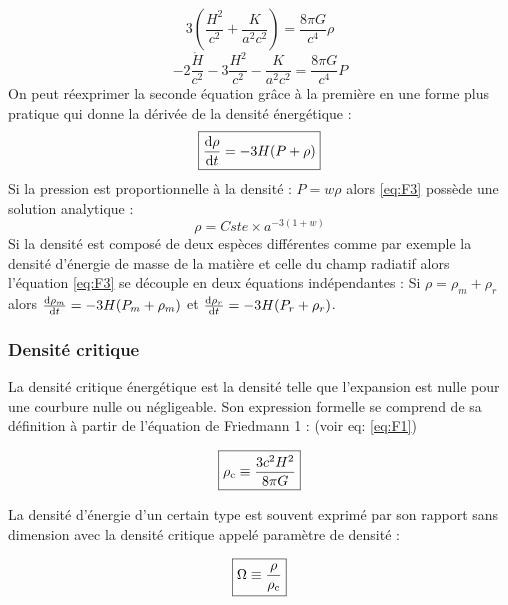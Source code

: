 \documentclass[10pt, a4paper]{report}
\numberwithin{equation}{subsection}
\begin{document}
\begin{equation} \label{eq:F1}
\boxed{3 \left(\frac{H^2}{c^2} + \frac{K}{a^2 c^2} \right) = \frac{8 \pi G}{c^4} \rho}
\end{equation}
\begin{equation} \label{eq:F2}
\boxed{- 2 \frac{\dot H}{c^2} - 3 \frac{H^2}{c^2} - \frac{K}{a^2 c^2} =  \frac{8 \pi G}{c^4} P }
\end{equation}
On peut réexprimer la seconde équation grâce à la première en une forme plus pratique qui donne la dérivée de la densité énergétique :
\begin{equation} \label{eq:F3}
\boxed{\frac{{\rm d}\rho}{{\rm d}t} = - 3 H (P + \rho) }
\end{equation}
Si la pression est proportionnelle à la densité : $P= w \rho$ alors \ref{eq:F3} possède une solution analytique :
\begin{equation} \label{eq:F3S}
\boxed{\rho = Cste \times a^{-3(1+w)}}
\end{equation}
Si la densité est composé de deux espèces différentes comme par exemple la densité d'énergie de masse de la matière et celle du champ radiatif alors l'équation \ref{eq:F3} se découple en deux équations indépendantes : Si $\rho = \rho_m + \rho_r$ alors $\frac{{\rm d}\rho_m}{{\rm d}t} = - 3 H (P_m + \rho_m) $ et $\frac{{\rm d}\rho_r}{{\rm d}t} = - 3 H (P_r + \rho_r)$.



\subsubsection{Densité critique}
La densité critique énergétique est la densité telle que l'expansion est nulle pour une courbure nulle ou négligeable. Son expression formelle se comprend de sa définition à partir de l'équation de Friedmann 1 : (voir eq: \ref{eq:F1})

\begin{equation} \label{eq:DEC}
\boxed{\rho_{\rm c} \equiv \frac{3 c^2 H^2 }{8 \pi G} }
\end{equation}

La densité d'énergie d'un certain type est souvent exprimé par son rapport sans dimension avec la densité critique appelé paramètre de densité :

\begin{equation} \label{eq:OD}
\boxed{\Omega \equiv \frac{\rho}{\rho_{\rm c}} }
\end{equation}
\end{document}
